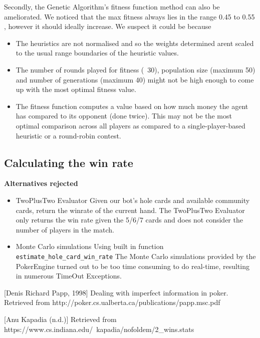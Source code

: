 \documentclass{article}
\begin{document}
Secondly, the Genetic Algorithm's fitness function method can also be ameliorated. We noticed that the max fitness always lies in the range 0.45 to 0.55 , however it should ideally increase. We suspect it could be because
\begin{itemize}
    \item The heuristics are not normalised and so the weights determined arent scaled to the usual range boundaries of the heuristic values. 
    \item The number of rounds played for fitness (~30), population size (maximum 50) and number of generations (maximum 40) might not be high enough to come up with the most optimal fitness value. 
    \item The fitness function computes a value based on how much money the agent has compared to its opponent (done twice). This may not be the most optimal comparison across all players as compared to a single-player-based heuristic or a round-robin contest.
\end{itemize}

\subsection{Calculating the win rate}

{\bf Alternatives rejected}

\begin{itemize}
    \item TwoPlusTwo Evaluator
    Given our bot’s hole cards and available community cards, return the winrate of the current hand.
    The TwoPlusTwo Evaluator only returns the win rate given the 5/6/7 cards and does not consider the number of players in the match.
    
    \item Monte Carlo simulations
    Using built in function {\tt estimate\_hole\_card\_win\_rate}
    The Monte Carlo simulations provided by the PokerEngine turned out to be too time consuming to do real-time, resulting in numerous TimeOut Exceptions.
\end{itemize} 

\appendix



[Denis Richard Papp, 1998] Dealing with imperfect information in poker. Retrieved from http://poker.cs.ualberta.ca/publications/papp.msc.pdf

[Anu Kapadia (n.d.)] Retrieved from https://www.cs.indiana.edu/~kapadia/nofoldem/2\_wins.stats

\end{document}
